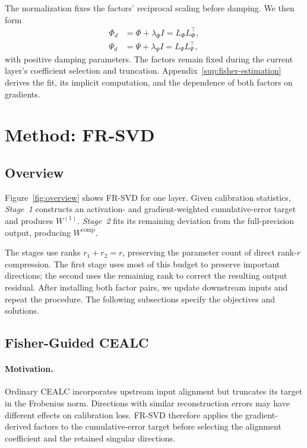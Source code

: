 \documentclass[11pt]{article}
\begin{document}
The normalization fixes the factors' reciprocal scaling before damping. We then form
\begin{equation}
\begin{aligned}
\Phi_d&=\Phi+\lambda_\Phi I=L_\Phi L_\Phi^\top,\\
\Psi_d&=\Psi+\lambda_\Psi I=L_\Psi L_\Psi^\top,
\end{aligned}
\label{eq:fisher-cholesky}
\end{equation}
with positive damping parameters. The factors remain fixed during the current layer's coefficient selection and truncation. Appendix~\ref{sup:fisher-estimation} derives the fit, its implicit computation, and the dependence of both factors on gradients.

\section{Method: FR-SVD}\label{sec:method}

\subsection{Overview}\label{sec:overview}

Figure~\ref{fig:overview} shows FR-SVD for one layer. Given calibration statistics, \emph{Stage~1} constructs an activation- and gradient-weighted cumulative-error target and produces $W^{(1)}$. \emph{Stage~2} fits its remaining deviation from the full-precision output, producing $W^{\mathrm{comp}}$.



The stages use ranks $r_1+r_2=r$, preserving the parameter count of direct rank-$r$ compression. The first stage uses most of this budget to preserve important directions; the second uses the remaining rank to correct the resulting output residual. After installing both factor pairs, we update downstream inputs and repeat the procedure. The following subsections specify the objectives and solutions.

\subsection{Fisher-Guided CEALC}\label{sec:fisher-cealc}

\paragraph{Motivation.}
Ordinary CEALC incorporates upstream input alignment but truncates its target in the Frobenius norm. Directions with similar reconstruction errors may have different effects on calibration loss. FR-SVD therefore applies the gradient-derived factors to the cumulative-error target before selecting the alignment coefficient and the retained singular directions.
\end{document}
